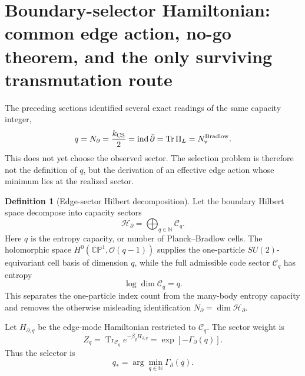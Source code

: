 \documentclass[aps,prd,reprint,nofootinbib,superscriptaddress,floatfix]{revtex4-2}
\numberwithin{equation}{section}
\theoremstyle{definition}
\newtheorem{definition}{Definition}[section]
\theoremstyle{plain}
\newcommand{\CP}{\mathbb{CP}}
\newcommand{\Ncap}{N_{\partial}}
\begin{document}
\section{Boundary-selector Hamiltonian: common edge action, no-go theorem, and the only surviving transmutation route}
\label{sec:edge-selector}

The preceding sections identified several exact readings of the same
capacity integer,
\begin{equation}
q=\Ncap=\frac{k_{\rm CS}}2=\operatorname{ind}\bar\partial
      =\operatorname{Tr}\Pi_L=N_{\rm v}^{\rm Bradlow}.
\end{equation}
This does not yet choose the observed sector.  The selection problem is
therefore not the definition of \(q\), but the derivation of an effective
edge action whose minimum lies at the realized sector.

\begin{definition}[Edge-sector Hilbert decomposition]
Let the boundary Hilbert space decompose into capacity sectors
\begin{equation}
\mathcal H_\partial=\bigoplus_{q\in\mathbb N}\mathcal C_q .
\end{equation}
Here \(q\) is the entropy capacity, or number of Planck--Bradlow cells.
The holomorphic space \(H^0(\CP^1,\mathcal O(q-1))\) supplies the
one-particle \(SU(2)\)-equivariant cell basis of dimension \(q\), while
the full admissible code sector \(\mathcal C_q\) has entropy
\begin{equation}
\log\dim \mathcal C_q=q .
\end{equation}
This separates the one-particle index count from the many-body entropy
capacity and removes the otherwise misleading identification
\(\Ncap=\dim\mathcal H_\partial\).
\end{definition}

Let \(H_{\partial,q}\) be the edge-mode Hamiltonian restricted to
\(\mathcal C_q\).  The sector weight is
\begin{equation}
Z_q=\operatorname{Tr}_{\mathcal C_q}e^{-\beta_q H_{\partial,q}}
    =\exp[-\Gamma_\partial(q)] .
\end{equation}
Thus the selector is
\begin{equation}
q_*=\arg\min_{q\in\mathbb N}\Gamma_\partial(q).
\end{equation}
\end{document}
